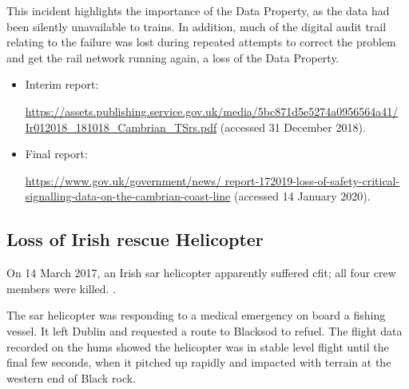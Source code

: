 This incident highlights the importance of the  Data Property, as the data had been silently unavailable to trains. In addition, much of the digital audit trail relating to the failure was lost during repeated attempts to correct the problem and get the rail network running again, a loss of the  Data Property.

\begin{samepage}
\begin{itemize}
\item Interim report: \raggedright{\href{https://assets.publishing.service.gov.uk/media/5bc871d5e5274a0956564a41/Ir012018_181018_Cambrian_TSrs.pdf}{https://assets.publishing.service.gov.uk/media/5bc871d5e5274a0956564a41/ Ir012018\_181018\_Cambrian\_TSrs.pdf} (accessed 31 December 2018).}
\item
  Final report: \raggedright{\href{https://www.gov.uk/government/news/report-172019-loss-of-safety-critical-signalling-data-on-the-cambrian-coast-line}{https://www.gov.uk/government/news/ report-172019-loss-of-safety-critical-signalling-data-on-the-cambrian-coast-line} (accessed 14 January 2020).}
\end{itemize}
\end{samepage}

\subsection{Loss of Irish rescue Helicopter} \label{bkm:incacc:irishsar}
On 14 March 2017, an Irish \gls{sar} helicopter apparently suffered \gls{cfit}; all four crew members were killed. .

The \gls{sar} helicopter was responding to a medical emergency on board a fishing vessel. It left Dublin and requested a route to Blacksod to refuel. The flight data recorded on the \gls{hums} showed the helicopter was in stable level flight until the final few seconds, when it pitched up rapidly and impacted with terrain at the western end of Black rock.

